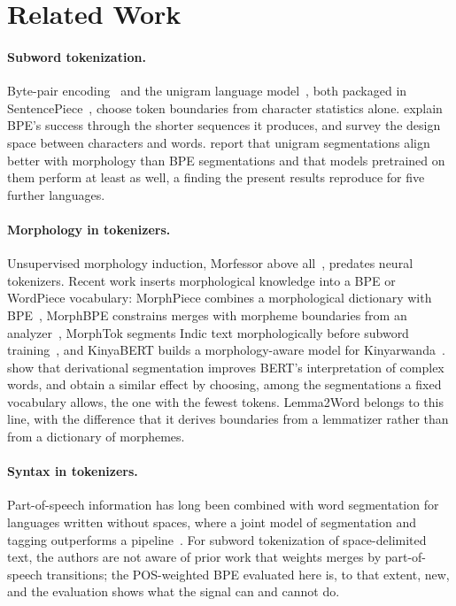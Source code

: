 \section{Related Work}\label{sec:related}

\paragraph{Subword tokenization.}
Byte-pair encoding~\cite{sennrich2016bpe} and the unigram language model~\cite{kudo2018subword}, both packaged in SentencePiece~\cite{kudo2018sentencepiece}, choose token boundaries from character statistics alone.
\citet{galle2019bpe} explain BPE's success through the shorter sequences it produces, and \citet{mielke2021between} survey the design space between characters and words.
\citet{bostrom2020bpe} report that unigram segmentations align better with morphology than BPE segmentations and that models pretrained on them perform at least as well, a finding the present results reproduce for five further languages.

\paragraph{Morphology in tokenizers.}
Unsupervised morphology induction, Morfessor above all~\cite{creutz2007morfessor}, predates neural tokenizers.
Recent work inserts morphological knowledge into a BPE or WordPiece vocabulary: MorphPiece combines a morphological dictionary with BPE~\cite{jabbar2023morphpiece}, MorphBPE constrains merges with morpheme boundaries from an analyzer~\cite{asgari2025morphbpe}, MorphTok segments Indic text morphologically before subword training~\cite{brahma2025morphtok}, and KinyaBERT builds a morphology-aware model for Kinyarwanda~\cite{nzeyimana2022kinyabert}.
\citet{hofmann2021superbizarre} show that derivational segmentation improves BERT's interpretation of complex words, and \citet{hofmann2022flota} obtain a similar effect by choosing, among the segmentations a fixed vocabulary allows, the one with the fewest tokens.
Lemma2Word belongs to this line, with the difference that it derives boundaries from a lemmatizer rather than from a dictionary of morphemes.

\paragraph{Syntax in tokenizers.}
Part-of-speech information has long been combined with word segmentation for languages written without spaces, where a joint model of segmentation and tagging outperforms a pipeline~\cite{zhang2008joint}.
For subword tokenization of space-delimited text, the authors are not aware of prior work that weights merges by part-of-speech transitions; the POS-weighted BPE evaluated here is, to that extent, new, and the evaluation shows what the signal can and cannot do.

